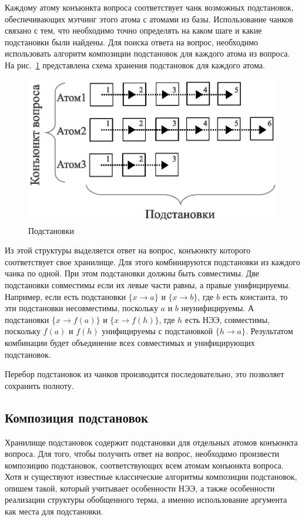Каждому атому конъюнкта вопроса соответствует чанк возможных подстановок, обеспечивающих мэтчинг этого атома с атомами из базы. Использование чанков связано с тем, что необходимо точно определять на каком шаге и какие подстановки были найдены. Для поиска ответа на вопрос, необходимо использовать алгоритм композиции подстановок для каждого атома из вопроса. На рис.~\ref{fig:anbase} представлена схема хранения подстановок для каждого атома.
\begin{figure}[h]
  \centering
  \includegraphics[width=0.6\linewidth]{pics/AnBase.eps}
  \caption{Подстановки}
  \label{fig:anbase}
\end{figure}

Из этой структуры выделяется ответ на вопрос, конъюнкту которого соответствует свое хранилище. Для этого комбинируются подстановки из каждого чанка по одной. При этом подстановки должны быть совместимы. Две подстановки совместимы если их левые части равны, а правые унифицируемы. Например, если есть подстановки $\{x \rightarrow a\}$ и $\{x \rightarrow b\}$, где $b$ есть константа, то эти подстановки несовместимы, поскольку $a$ и $b$ неунифицируемы. А подстановки $\{x \rightarrow f(a)\}$ и $\{x \rightarrow f(h)\}$, где $h$ есть НЭЭ, совместимы, поскольку $f(a)$ и $f(h)$ унифицируемы с подстановкой $\{h \rightarrow a\}$. Результатом комбинации будет объединение всех совместимых и унифицирующих подстановок.

Перебор подстановок из чанков производится последовательно, это позволяет сохранить полноту.


\subsection{Композиция подстановок}

Хранилище подстановок содержит подстановки для отдельных атомов конъюнкта вопроса. Для того, чтобы получить ответ на вопрос, необходимо произвести композицию подстановок, соответствующих всем атомам конъюнкта вопроса. Хотя и существуют известные классические алгоритмы композиции подстановок, опишем такой, который учитывает особенности НЭЭ, а также особенности реализации структуры обобщенного терма, а именно использование аргумента как места для подстановки.

